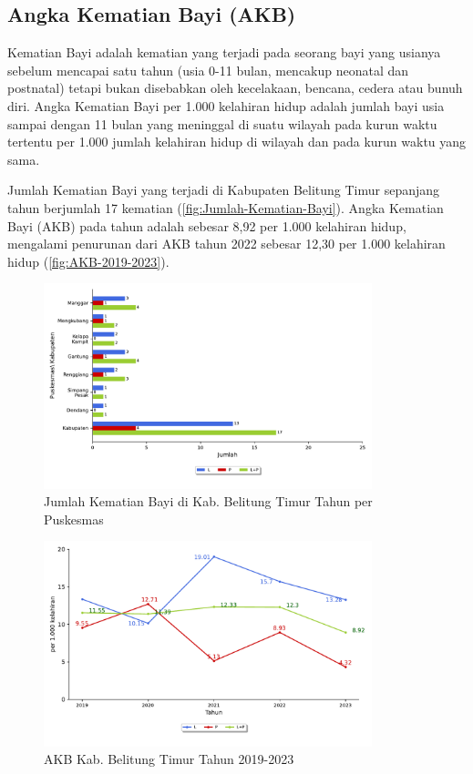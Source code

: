 \subsection{Angka Kematian Bayi (AKB)}
Kematian Bayi adalah kematian yang terjadi pada seorang bayi yang usianya sebelum mencapai satu tahun (usia 0-11 bulan, mencakup neonatal dan postnatal) tetapi bukan disebabkan oleh kecelakaan, bencana, cedera atau bunuh diri. Angka Kematian Bayi per 1.000 kelahiran hidup adalah jumlah bayi usia sampai dengan 11 bulan yang meninggal di suatu wilayah pada kurun waktu tertentu per 1.000 jumlah kelahiran hidup di wilayah dan pada kurun waktu yang sama.

Jumlah Kematian Bayi yang terjadi di Kabupaten Belitung Timur sepanjang tahun \tP berjumlah 17 kematian (\autoref{fig:Jumlah-Kematian-Bayi}). Angka Kematian Bayi (AKB) pada tahun \tP adalah sebesar 8,92 per 1.000 kelahiran hidup, mengalami penurunan dari AKB tahun 2022 sebesar 12,30 per 1.000 kelahiran hidup (\autoref{fig:AKB-2019-2023}).

\begin{figure}[H]
    \centering{}
    \includegraphics[width=0.85\textwidth]{bab_05/bab_05_10_kematianBayi}
    \caption{Jumlah Kematian Bayi di Kab. Belitung Timur Tahun \tP per Puskesmas}
    \label{fig:Jumlah-Kematian-Bayi}
\end{figure}

\begin{figure}[H]
    \centering{}
    \includegraphics[width=0.85\textwidth]{bab_05/bab_05_10_plotBayi}
    \caption{AKB Kab. Belitung Timur Tahun 2019-2023}
    \label{fig:AKB-2019-2023}
\end{figure}


